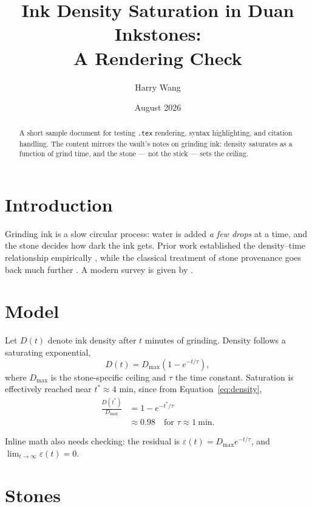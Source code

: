 \documentclass[11pt]{article}
\title{Ink Density Saturation in Duan Inkstones:\\A Rendering Check}
\author{Harry Wang}
\date{August 2026}
\begin{document}
\maketitle

\begin{abstract}
A short sample document for testing \texttt{.tex} rendering, syntax
highlighting, and citation handling. The content mirrors the vault's
notes on grinding ink: density saturates as a function of grind time,
and the stone --- not the stick --- sets the ceiling.
\end{abstract}

\section{Introduction}

Grinding ink is a slow circular process: water is added \emph{a few
drops} at a time, and the stone decides how dark the ink gets. Prior
work established the density--time relationship empirically
\citep{tanaka2019}, while the classical treatment of stone provenance
goes back much further \citep{mizuta1968}. A modern survey is given by
\citet{chen2021}.

\section{Model}

Let $D(t)$ denote ink density after $t$ minutes of grinding. Density
follows a saturating exponential,
\begin{equation}
  \label{eq:density}
  D(t) = D_{\max}\left(1 - e^{-t/\tau}\right),
\end{equation}
where $D_{\max}$ is the stone-specific ceiling and $\tau$ the time
constant. Saturation is effectively reached near $t^* \approx 4$ min,
since from Equation~\eqref{eq:density},
\begin{align}
  \frac{D(t^*)}{D_{\max}} &= 1 - e^{-t^*/\tau} \\
                          &\approx 0.98 \quad \text{for } \tau \approx 1\ \text{min}.
\end{align}

Inline math also needs checking: the residual is $\varepsilon(t) =
D_{\max} e^{-t/\tau}$, and $\lim_{t \to \infty} \varepsilon(t) = 0$.

\section{Stones}
\end{document}
